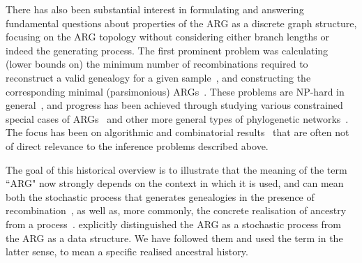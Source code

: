 \documentclass{article}
\begin{document}
There has also been substantial interest in formulating and answering
fundamental questions about properties
of the ARG as a discrete graph structure, focusing on the ARG topology without considering
either branch lengths or indeed the generating process.
The first prominent problem was calculating (lower bounds on) the minimum number of
recombinations required to reconstruct a valid genealogy for a given
sample~\citep{myers2003bounds}, and constructing the corresponding
minimal (parsimonious)
ARGs~\citep{song2003parsimonious,song2005efficient,lyngso2005minimum}.
These problems are NP-hard in general~\citep{wang2001perfect}, and progress has
been achieved through studying various constrained special cases of ARGs~\citep[e.g.][]{gusfield2004optimal} and
other more general types of phylogenetic networks~\citep{huson2010phylogenetic}. The
focus has been on algorithmic and combinatorial results~\citep{gusfield2014recombinatorics}
that are often not of
direct relevance to the inference problems described above.


The goal of this historical overview is to illustrate that the meaning of the term ``ARG" now strongly
depends on the context in which it is used, and can mean both the
stochastic process that generates genealogies in the presence of
recombination~\citep[e.g.][]{nordborg2000linkage,birkner2013ancestral,
wilton2015smc,griffiths2016coalescent},
as well as, more commonly, the concrete realisation of ancestry from a
process~\citep[e.g.][]{gusfield2014recombinatorics,mathieson2020ancestry,brandt2021evaluation}.
\cite{minichiello2006mapping} explicitly distinguished the ARG as a
stochastic process from the ARG as a data structure. We have followed them and
used the term in the latter sense, to mean a specific realised ancestral history.
\end{document}

